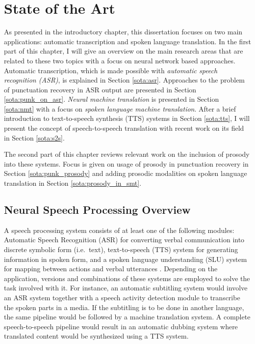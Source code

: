 
\chapter{State of the Art}
\label{chapter:sota}
As presented in the introductory chapter, this dissertation focuses on two main applications: automatic transcription and spoken language translation. In the first part of this chapter, I will give an overview on the main research areas that are related to these two topics with a focus on neural network based approaches. Automatic transcription, which is made possible with \textit{automatic speech recognition (ASR)}, is explained in Section \ref{sota:asr}. Approaches to the problem of punctuation recovery in ASR output are presented in Section \ref{sota:punk_on_asr}. \textit{Neural machine translation} is presented in Section \ref{sota:nmt} with a focus on \textit{spoken language machine translation}. After a brief introduction to text-to-speech synthesis (TTS) systems in Section \ref{sota:tts}, I will present the concept of speech-to-speech translation with recent work on its field in Section \ref{sota:s2s}.

The second part of this chapter reviews relevant work on the inclusion of prosody into these systems. Focus is given on usage of prosody in punctuation recovery in Section \ref{sota:punk_prosody} and adding prosodic modalities on spoken language translation in Section \ref{sota:prosody_in_smt}. 

\section{Neural Speech Processing Overview}

A speech processing system consists of at least one of the following modules: Automatic Speech Recognition (ASR) for converting verbal communication into discrete symbolic form (i.e.~text), text-to-speech (TTS) system for generating information in spoken form, and a spoken language understanding (SLU) system for mapping between actions and verbal utterances \citep{slp_book}. Depending on the application, versions and combinations of these systems are employed to solve the task involved with it. For instance, an automatic subtitling system would involve an ASR system together with a speech activity detection module to transcribe the spoken parts in a media. If the subtitling is to be done in another language, the same pipeline would be followed by a machine translation system. A complete speech-to-speech pipeline would result in an automatic dubbing system where translated content would be synthesized using a TTS system. 

